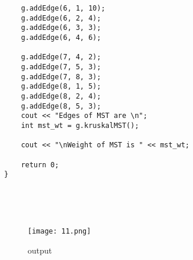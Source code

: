 \documentclass[11pt]{article}            %
\begin{document}
\begin{lstlisting}
    g.addEdge(6, 1, 10);
    g.addEdge(6, 2, 4);
    g.addEdge(6, 3, 3);
    g.addEdge(6, 4, 6);
    
    g.addEdge(7, 4, 2);
    g.addEdge(7, 5, 3);
    g.addEdge(7, 8, 3);
    g.addEdge(8, 1, 5);
    g.addEdge(8, 2, 4);
    g.addEdge(8, 5, 3);
    cout << "Edges of MST are \n";
    int mst_wt = g.kruskalMST();
 
    cout << "\nWeight of MST is " << mst_wt;
 
    return 0;
}





\end{lstlisting}
\begin{figure*}
\centering
  \texttt{[image: 11.png]}
\caption{output}
\label{Figure:3}    
\end{figure*} 




 
\end{document}
